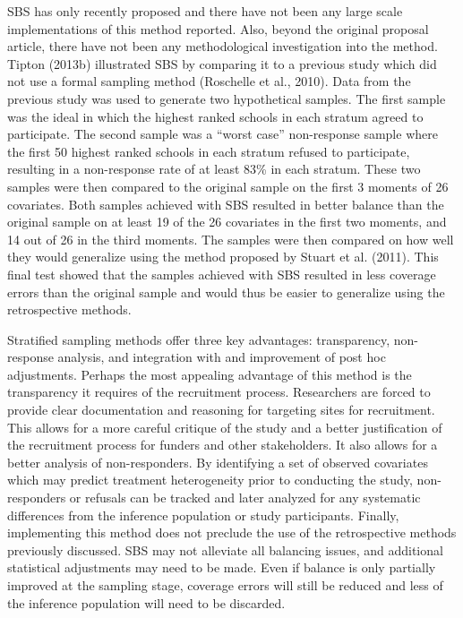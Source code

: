 \documentclass[man,floatsintext]{apa6}
\begin{document}
SBS has only recently proposed and there have not been any large scale implementations of this method reported. Also, beyond the original proposal article, there have not been any methodological investigation into the method. Tipton (2013b) illustrated SBS by comparing it to a previous study which did not use a formal sampling method (Roschelle et al., 2010). Data from the previous study was used to generate two hypothetical samples. The first sample was the ideal in which the highest ranked schools in each stratum agreed to participate. The second sample was a \enquote{worst case} non-response sample where the first 50 highest ranked schools in each stratum refused to participate, resulting in a non-response rate of at least 83\% in each stratum. These two samples were then compared to the original sample on the first 3 moments of 26 covariates. Both samples achieved with SBS resulted in better balance than the original sample on at least 19 of the 26 covariates in the first two moments, and 14 out of 26 in the third moments. The samples were then compared on how well they would generalize using the method proposed by Stuart et al. (2011). This final test showed that the samples achieved with SBS resulted in less coverage errors than the original sample and would thus be easier to generalize using the retrospective methods.

Stratified sampling methods offer three key advantages: transparency, non-response analysis, and integration with and improvement of post hoc adjustments. Perhaps the most appealing advantage of this method is the transparency it requires of the recruitment process. Researchers are forced to provide clear documentation and reasoning for targeting sites for recruitment. This allows for a more careful critique of the study and a better justification of the recruitment process for funders and other stakeholders. It also allows for a better analysis of non-responders. By identifying a set of observed covariates which may predict treatment heterogeneity prior to conducting the study, non-responders or refusals can be tracked and later analyzed for any systematic differences from the inference population or study participants. Finally, implementing this method does not preclude the use of the retrospective methods previously discussed. SBS may not alleviate all balancing issues, and additional statistical adjustments may need to be made. Even if balance is only partially improved at the sampling stage, coverage errors will still be reduced and less of the inference population will need to be discarded.
\end{document}
